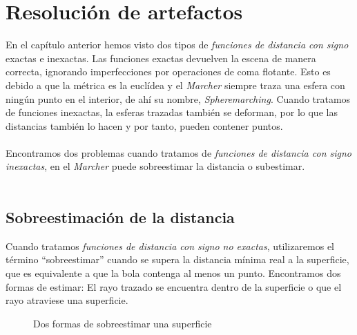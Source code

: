 \chapter{Resolución de artefactos}
En el capítulo anterior hemos visto dos tipos de \textit{funciones de distancia con signo} exactas e inexactas. Las funciones exactas devuelven la escena de manera correcta, ignorando imperfecciones por operaciones de coma flotante. Esto es debido a que la métrica es la euclídea y el \textit{Marcher} siempre traza una esfera con ningún punto en el interior, de ahí su nombre, \textit{Spheremarching}. Cuando tratamos de funciones inexactas, la esferas trazadas también se deforman, por lo que las distancias también lo hacen y por tanto, pueden contener puntos. \\\\
Encontramos dos problemas cuando tratamos de \textit{funciones de distancia con signo inexactas}, en el \textit{Marcher} puede sobreestimar la distancia o subestimar. \\\\

\section{Sobreestimación de la distancia}
Cuando tratamos \textit{funciones de distancia con signo no exactas}, utilizaremos el término \enquote{sobreestimar} cuando se supera la distancia mínima real a la superficie, que es equivalente a que la bola contenga al menos un punto. Encontramos dos formas de  estimar: El rayo trazado se encuentra dentro de la superficie o que el rayo atraviese una superficie. 

\begin{figure}[H]
  \centering
  \hfill
  \captionsetup{justification=centering}%
  \caption{Dos formas de sobreestimar una superficie}\label{fig:estimacion}
\end{figure}

